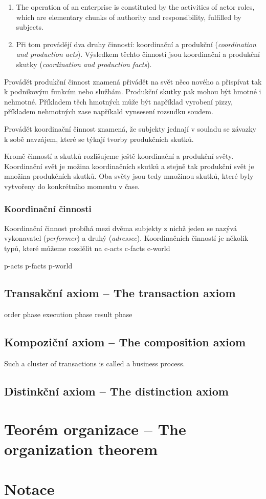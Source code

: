 \documentclass[]{article}
\begin{document}
\begin{enumerate}
\item The operation of an enterprise is constituted by the activities of actor roles, which are elementary chunks of authority and responsibility, fulfilled by subjects. %
\item Při tom provádějí dva druhy činností: koordinační a produkční (\textit{coordination and production acts}). Výsledkem těchto činností jsou koordinační a produkční skutky (\textit{coordination and production facts}).
\end{enumerate}

Provádět produkční činnost znamená přivádět na svět něco nového a přispívat tak k podnikovým funkcím nebo službám. Produkční skutky pak mohou být hmotné i nehmotné. Příkladem těch hmotných může být například vyrobení pizzy, příkladem nehmotných zase napříkald vynsesení rozsudku soudem.

Provádět koordinační činnost znamená, že subjekty jednají v souladu se závazky k sobě navzájem, které se týkají tvorby produkčních skutků.

Kromě činností a skutků rozlišujeme ještě koordinační a produkční světy. Koordinační svět je možina koordinačních skutků a stejně tak produkční svět je množina produkčních skutků. Oba světy jsou tedy množinou skutků, které byly vytvořeny do konkrétního momentu v čase.


\subsubsection{Koordinační činnosti}
Koordinační činnost probíhá mezi dvěma subjekty z nichž jeden se nazývá vykonavatel (\textit{performer}) a druhý (\textit{adressee}). Koordinačních činností je několik typů, které můžeme rozdělit na 
c-acts
c-facts
c-world

p-acts
p-facts
p-world
\subsection{Transakční axiom – The transaction axiom}
order phase
execution phase
result phase
\subsection{Kompoziční axiom – The composition axiom}
Such a cluster of transactions is called a business process.
\subsection{Distinkční axiom – The distinction axiom}
\section{Teorém organizace – The organization theorem}
\section{Notace}

\nocite{*}


\end{document}
